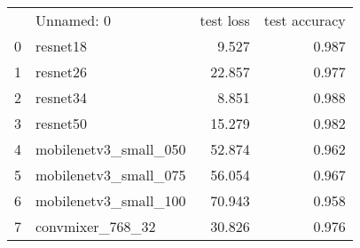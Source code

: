 \begin{tabular}{llrr}
 & Unnamed: 0 & test loss & test accuracy \\
0 & resnet18 & 9.527 & 0.987 \\
1 & resnet26 & 22.857 & 0.977 \\
2 & resnet34 & 8.851 & 0.988 \\
3 & resnet50 & 15.279 & 0.982 \\
4 & mobilenetv3_small_050 & 52.874 & 0.962 \\
5 & mobilenetv3_small_075 & 56.054 & 0.967 \\
6 & mobilenetv3_small_100 & 70.943 & 0.958 \\
7 & convmixer_768_32 & 30.826 & 0.976 \\
\end{tabular}
